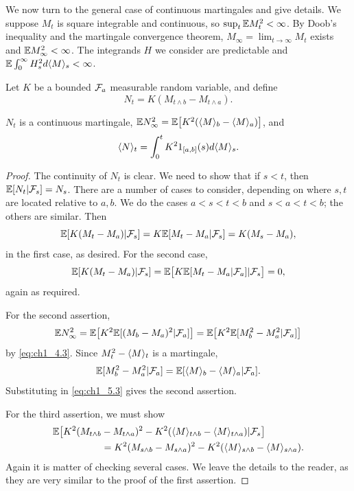 We now turn to the general case of continuous martingales and give details. We suppose $M_t$ is square integrable and continuous, so $\sup_t \mathbb{E} M_t^2 < \allowbreak \infty$. By Doob's inequality and the martingale convergence theorem, $M_\infty = \lim_{t\to\infty} M_t$ exists and $\mathbb{E} M_\infty^2 < \infty$. The integrands $H$ we consider are predictable and $\mathbb{E} \int_0^\infty H_s^2 d\langle M \rangle_s < \infty$.

Let $K$ be a bounded $\mathcal{F}_a$ measurable random variable, and define
\[
    N_t = K(M_{t\wedge b} - M_{t\wedge a}).
\]

\begin{lemma}\label{lem:ch1_5.1}
$N_t$ is a continuous martingale, $\mathbb{E} N_\infty^2 = \mathbb{E}\big[K^2(\langle M \rangle_b - \langle M \rangle_a)\big]$, and
\[
    \langle N \rangle_t = \int_0^t K^21_{[a,b]}(s)d\langle M \rangle_s.
\]
\end{lemma}

\begin{proof}
The continuity of $N_t$ is clear. We need to show that if $s < t$, then $\mathbb{E}[N_t| \mathcal{F}_s] = N_s$. There are a number of cases to consider, depending on where $s,t$ are located relative to $a,b$. We do the cases $a < s < t < b$ and $s < a < t < b$; the others are similar. Then
\[
    \mathbb{E}[K(M_t - M_a)| \mathcal{F}_s] = K\mathbb{E}[M_t - M_a| \mathcal{F}_s] = K(M_s - M_a),
\]
in the first case, as desired. For the second case,
\[
    \mathbb{E}[K(M_t - M_a)| \mathcal{F}_s] = \mathbb{E}\big[K\mathbb{E}[M_t - M_a| \mathcal{F}_a]| \mathcal{F}_s\big] = 0,
\]
again as required.

For the second assertion,
\begin{equation}\label{eq:ch1_5.3}
    \mathbb{E} N_\infty^2 = \mathbb{E}\big[K^2\mathbb{E}[(M_b - M_a)^2| \mathcal{F}_a]\big] = \mathbb{E}\big[K^2\mathbb{E}[M_b^2 - M_a^2| \mathcal{F}_a]\big]
\end{equation}
by \eqref{eq:ch1_4.3}. Since $M_t^2 - \langle M \rangle_t$ is a martingale,
\[
    \mathbb{E}[M_b^2 - M_a^2| \mathcal{F}_a] = \mathbb{E}[\langle M \rangle_b - \langle M \rangle_a| \mathcal{F}_a].
\]
Substituting in \eqref{eq:ch1_5.3} gives the second assertion.

\mpagebreak

For the third assertion, we must show
\begin{align*}
    \mathbb{E}\big[K^2(M_{t\wedge b}&-M_{t\wedge a})^2 - K^2(\langle M \rangle_{t\wedge b} - \langle M \rangle_{t\wedge a})| \mathcal{F}_s \big] \\
    &=K^2(M_{s\wedge b}-M_{s\wedge a})^2 - K^2(\langle M \rangle_{s\wedge b} - \langle M \rangle_{s\wedge a}).
\end{align*}
Again it is matter of checking several cases. We leave the details to the
reader, as they are very similar to the proof of the first assertion.
\end{proof}

